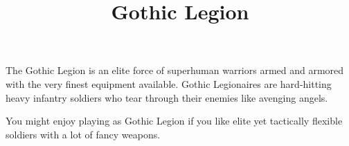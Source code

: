 








\title{Gothic Legion}

\maketitle

The Gothic Legion is an elite force of superhuman warriors armed and armored with the very finest equipment available. Gothic Legionaires are hard-hitting heavy infantry soldiers who tear through their enemies like avenging angels.

You might enjoy playing as Gothic Legion if you like elite yet tactically flexible soldiers with a lot of fancy weapons.







\newcommand{\CombatKnife}[1][4+]{\textbf{Combat Knife}: {#1} D1}
\newcommand{\DemoCharges}[1][4+]{\textbf{Demo Charges}: {#1} D6 Critical 9+, Deadly D5+2, Slow, Unstable 1, May only be used against Vehicle or Monster models}
\newcommand{\EnergyFist}[1][5+]{\textbf{Energy Fist}: {#1} D6 [Deadly 4]}
\newcommand{\EnergyFistLeader}[1][4+]{\textbf{Energy Fist}: A2 {#1} D6 [Deadly 4]}
\newcommand{\EnergySword}[1][4+]{\textbf{Energy Sword}: A2 {#1} D6 [Deadly 2]}
\newcommand{\EnergySwordLeader}[1][3+]{\textbf{Energy Sword}: A3 {#1} D6 [Deadly 2]}
\newcommand{\Sword}[1][4+]{\textbf{Sword}: A2 {#1} D2}






\newcommand{\CrushingTracks}[1][9+]{\textbf{Crushing Tracks}: A3 {#1} D8 [Deadly 4]}
\newcommand{\HeavyEnergyFist}[1][4+]{\textbf{Heavy Energy Fist}: A3 {#1} D7 [Deadly 5]}
\newcommand{\Ram}[1][7+]{\textbf{Ram}: {#1} D4 [Deadly 4]}


\newcommand{\PlasmaRifle}[1][4+]{\textbf{Plasma Rifle}: R20 {#1} D6, [Deadly 2, Unstable 1]}
\newcommand{\PlasmaPistol}[1][4+]{\textbf{Plasma Pistol}: R10 {#1} D6, [Deadly 2, Unstable 1]}
\newcommand{\BattlePistol}[1][4+]{\textbf{Battle Pistol}: R10 {#1} D2}
\newcommand{\BattleRifle}[1][4+]{\textbf{Battle Rifle}: R20 {#1} D2}

